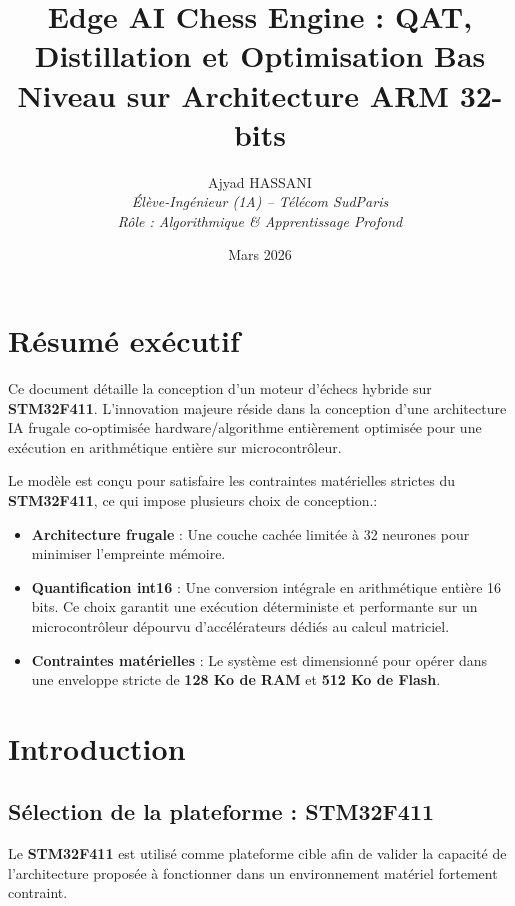 \documentclass[11pt, a4paper]{article}
\title{\textbf{Edge AI Chess Engine : QAT, Distillation et Optimisation Bas Niveau sur Architecture ARM 32-bits}}
\author{Ajyad HASSANI \\ \textit{Élève-Ingénieur (1A) -- Télécom SudParis} \\ \textit{Rôle : Algorithmique \& Apprentissage Profond}}
\date{Mars 2026}
\begin{document}
\maketitle
\thispagestyle{empty}

\newpage
\tableofcontents
\thispagestyle{empty}
\newpage

\setcounter{page}{1}


\section{Résumé exécutif}
Ce document détaille la conception d'un moteur d'échecs hybride sur \textbf{STM32F411}. L'innovation majeure réside dans la conception d'une architecture IA frugale co-optimisée hardware/algorithme entièrement optimisée pour une exécution en arithmétique entière sur microcontrôleur.

Le modèle est conçu pour satisfaire les contraintes matérielles strictes du \textbf{STM32F411}, ce qui impose plusieurs choix de conception.:
\begin{itemize}
    \item \textbf{Architecture frugale} : Une couche cachée limitée à 32 neurones pour minimiser l'empreinte mémoire.
    \item \textbf{Quantification int16} : Une conversion intégrale en arithmétique entière 16 bits. Ce choix garantit une exécution déterministe et performante sur un microcontrôleur dépourvu d'accélérateurs dédiés au calcul matriciel.
    \item \textbf{Contraintes matérielles} : Le système est dimensionné pour opérer dans une enveloppe stricte de \textbf{128 Ko de RAM} et \textbf{512 Ko de Flash}.
\end{itemize}

\section{Introduction}

\subsection{Sélection de la plateforme : STM32F411}

Le \textbf{STM32F411} est utilisé comme plateforme cible afin de valider la capacité de l’architecture proposée à fonctionner dans un environnement matériel fortement contraint.
\end{document}
